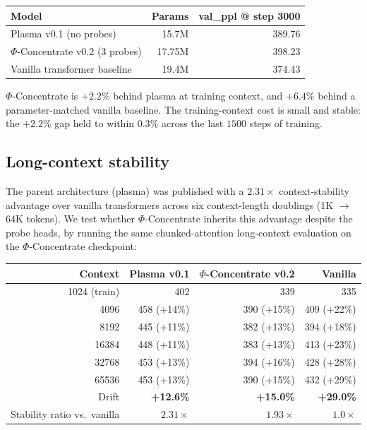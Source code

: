 \documentclass[11pt]{article}
\begin{document}
\begin{center}
\begin{tabular}{lrr}
\toprule
Model & Params & val\_ppl @ step 3000 \\
\midrule
Plasma v0.1 (no probes) & 15.7M & 389.76 \\
$\Phi$-Concentrate v0.2 (3 probes) & 17.75M & 398.23 \\
Vanilla transformer baseline & 19.4M & 374.43 \\
\bottomrule
\end{tabular}
\end{center}

$\Phi$-Concentrate is $+2.2\%$ behind plasma at training context, and
$+6.4\%$ behind a parameter-matched vanilla baseline. The training-context
cost is small and stable: the $+2.2\%$ gap held to within $0.3\%$ across
the last $1500$ steps of training.

\subsection{Long-context stability}

The parent architecture (plasma) was published with a $2.31\times$
context-stability advantage over vanilla transformers across six
context-length doublings (1K $\to$ 64K tokens). We test whether
$\Phi$-Concentrate inherits this advantage despite the probe heads, by
running the same chunked-attention long-context evaluation on the
$\Phi$-Concentrate checkpoint:

\begin{center}
\begin{tabular}{rrrr}
\toprule
Context & Plasma v0.1 & $\Phi$-Concentrate v0.2 & Vanilla \\
\midrule
1024 (train) & 402 & 339 & 335 \\
4096   & 458 (+14\%) & 390 (+15\%) & 409 (+22\%) \\
8192   & 445 (+11\%) & 382 (+13\%) & 394 (+18\%) \\
16384  & 448 (+11\%) & 383 (+13\%) & 413 (+23\%) \\
32768  & 453 (+13\%) & 394 (+16\%) & 428 (+28\%) \\
65536  & 453 (+13\%) & 390 (+15\%) & 432 (+29\%) \\
\midrule
Drift  & \textbf{+12.6\%} & \textbf{+15.0\%} & \textbf{+29.0\%} \\
Stability ratio vs.\ vanilla & $\mathbf{2.31\times}$ & $\mathbf{1.93\times}$ & $1.0\times$ \\
\bottomrule
\end{tabular}
\end{center}
\end{document}
